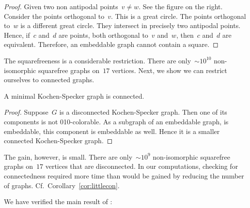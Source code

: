 \documentclass{report}
\begin{document}
\begin{proof}
    Given two non antipodal points~$v\neq w$.
    See the figure on the right.
    Consider the points orthogonal to~$v$.
    This is a great circle.
    The points orthogonal to~$w$ is a different great circle.
    They intersect in precisely two antipodal points.
    Hence, if~$c$ and~$d$ are points, both orthogonal to~$v$ and~$w$,
    then~$c$ and~$d$ are equivalent.
    Therefore, an embeddable graph cannot contain a square.
\end{proof}

The squarefreeness is a considerable restriction.  There are
only~${\sim}10^{10}$ non-isomorphic squarefree graphs on~$17$
vertices.\cite{sf-sloane}
Next, we show we can restrict ourselves to connected graphs.
\begin{proposition}\label{prop:ks-conn}
    A minimal Kochen-Specker graph is connected.
\end{proposition}
\begin{proof}
    Suppose~$G$ is a disconnected Kochen-Specker graph.
    Then one of its components is not 010-colorable.
    As a subgraph of an embeddable graph, is embeddable,
    this component is embeddable as well.
    Hence it is a smaller connected Kochen-Specker graph.
\end{proof}
The gain, however, is small.
There are only~${\sim}10^9$ non-isomorphic squarefree graphs on~$17$
vertices that are disconnected.
In our computations, checking for connectedness
required more time than would be gained by reducing the number of graphs.
Cf.~Corollary~\ref{cor:littlecon}.

We have verified the main result of \cite{aow11}:

\end{document}
